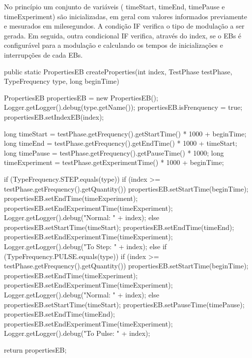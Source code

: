 No princípio um conjunto de variáveis ( \textsf{timeStart}, \textsf{timeEnd}, \textsf{timePause} e \textsf{timeExperiment}) são inicializadas, em geral com valores informados previamente e mesurados em milesegundos. A condição IF verifica o tipo de modulação a ser gerada. Em seguida, outra condicional IF verifica, através do index, se o EBs é configurável para a modulação e calculando os tempos de inicializações e interrupções de cada EBs.

\begin{codigo}[caption={Algoritmo calcula os tempos de iniciaçização e termino para cada um dos Clientes}, label={code:createProperties}, breaklines=true]
	public static PropertiesEB createProperties(int index, TestPhase testPhase, TypeFrequency type, long beginTime) {
		
		PropertiesEB propertiesEB = new PropertiesEB();
		Logger.getLogger().debug(type.getName());
		propertiesEB.isFrenquency = true;
		propertiesEB.setIndexEB(index);
		
		long timeStart = testPhase.getFrequency().getStartTime() * 1000 + beginTime;
		long timeEnd   = testPhase.getFrequency().getEndTime() * 1000 + timeStart;
		long timePause = testPhase.getFrequency().getPauseTime() * 1000;
		long timeExperiment = testPhase.getExperimentTime() * 1000 + beginTime;
		
		if (TypeFrequency.STEP.equals(type)) {
			if (index >= testPhase.getFrequency().getQuantity()) {
				propertiesEB.setStartTime(beginTime);
				propertiesEB.setEndTime(timeExperiment);
				propertiesEB.setEndExperimentTime(timeExperiment);
				Logger.getLogger().debug("Normal: " + index);
			} else {
			propertiesEB.setStartTime(timeStart);
			propertiesEB.setEndTime(timeEnd);
			propertiesEB.setEndExperimentTime(timeExperiment);
			Logger.getLogger().debug("To Step: " + index);
		}
	} else if (TypeFrequency.PULSE.equals(type)) {
	if (index >= testPhase.getFrequency().getQuantity()) {
		propertiesEB.setStartTime(beginTime);
		propertiesEB.setEndTime(timeExperiment);
		propertiesEB.setEndExperimentTime(timeExperiment);
		Logger.getLogger().debug("Normal: " + index);
	} else {
	propertiesEB.setStartTime(timeStart);
	propertiesEB.setPauseTime(timePause);
	propertiesEB.setEndTime(timeEnd);
	propertiesEB.setEndExperimentTime(timeExperiment);
	Logger.getLogger().debug("To Pulse: " + index);
}
}

return propertiesEB;

}

\end{codigo}

